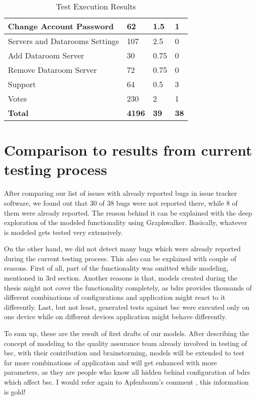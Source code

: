\begin{table}[]
\begin{tabular}{|l|p{2cm}|p{2cm}|p{2cm}|}
        Change Account Password & 62 & 1.5 & 1 \\
        \hline
        Servers and Datarooms Settings & 107 & 2.5 & 0 \\
        \hline
        Add Dataroom Server & 30 & 0.75 & 0 \\
        \hline
        Remove Dataroom Server & 72 & 0.75 & 0 \\
        \hline
        Support & 64 & 0.5 & 3 \\
        \hline
        Votes & 230 & 2 & 1 \\
        \hline
        \textbf{Total} & \textbf{4196} & \textbf{39} & \textbf{38}\\
        \hline
    \end{tabular}
    \caption{Test Execution Results }
    \label{tab:Test_Results}
\end{table}

\section{Comparison to results from current testing process}

\par
After comparing our list of issues with already reported bugs in issue tracker software, we found out that 30 of 38 bugs were not reported there, while 8 of them were already reported. The reason behind it can be explained with the deep exploration of the modeled functionality using Graphwalker. Basically, whatever is modeled gets tested very extensively.

\par
On the other hand, we did not detect many bugs which were already reported during the current testing process. This also can be explained with couple of reasons. First of all, part of the functionality was omitted while modeling, mentioned in 3rd section. Another reasons is that, models created during the thesis might not cover the functionality completely, as \acrshort{bdrs} provides thousands of different combinations of configurations and application might react to it differently. Last, but not least, generated tests against \acrshort{bsc} were executed only on one device while on different devices application might behave differently.

\par
To sum up, these are the result of first drafts of our models. After describing the concept of modeling to the quality assurance team already involved in testing of \acrshort{bsc}, with their contribution and brainstorming, models will be extended to test far more combinations of application and will get enhanced with more parameters, as they are people who know all hidden behind configuration of \acrshort{bdrs} which affect \acrshort{bsc}. I would refer again to Apfenbaum's comment \cite{Apfenbaum_MBT}, this information is gold!

